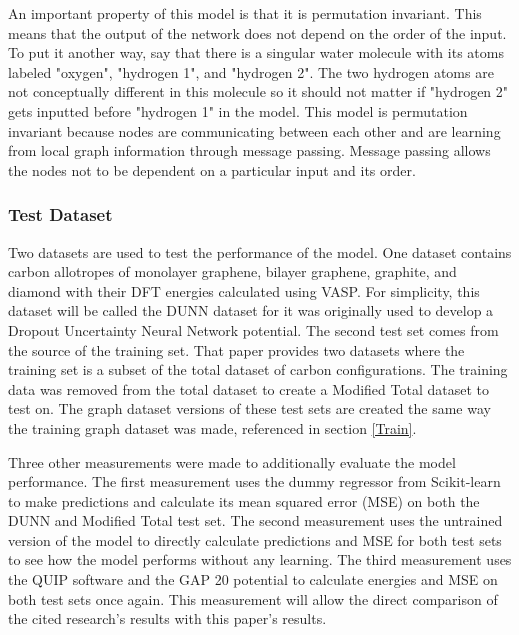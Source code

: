 \documentclass[12pt]{scrartcl}
\begin{document}
An important property of this model is that it is permutation invariant. This means that the output of 
the network does not depend on the order of the input. To put it another way, say that there is a singular
water molecule with its atoms labeled "oxygen", "hydrogen 1", and "hydrogen 2". The two hydrogen atoms 
are not conceptually different in this molecule so it should not matter if "hydrogen 2" gets inputted 
before "hydrogen 1" in the model. This model is permutation invariant because nodes are communicating 
between each other and are learning from local graph information through message passing. Message passing 
allows the nodes not to be dependent on a particular input and its order.

\subsubsection{Test Dataset} 
Two datasets are used to test the performance of the model. One dataset contains carbon allotropes of monolayer graphene, bilayer graphene, graphite, and diamond with their DFT energies calculated using VASP. For simplicity, this dataset will be called the DUNN dataset for it was originally used to develop a Dropout Uncertainty Neural Network potential\cite{dunn}. The second test set comes from the source of the training set. That paper\cite{gap20} provides two datasets where the training set is a subset of the total dataset of carbon configurations. The training data was removed from the total dataset to create a Modified Total dataset to test on. The graph dataset versions of these test sets are created the same way the training graph dataset was made, referenced in section \ref{Train}. 

Three other measurements were made to additionally evaluate the model performance. The first measurement uses the dummy regressor from Scikit-learn to make predictions and calculate its mean squared error (MSE) on both the DUNN and Modified Total test set. The second measurement uses the untrained version of the model to directly calculate predictions and MSE for both test sets to see how the model performs without any learning. The third measurement uses the QUIP software and the GAP 20 potential\cite{gap20} to calculate energies and MSE on both test sets once again. This measurement will allow the direct comparison of the cited research's results with this paper's results.


\newpage
\end{document}
